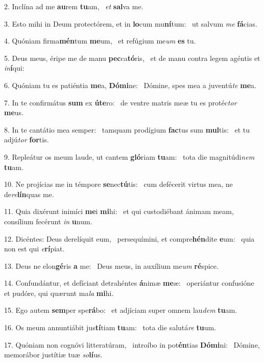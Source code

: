 2. Inclína ad me \textbf{au}rem \textbf{tu}am, \ast\  \textit{et} \textbf{sal}va me.\

3. Esto mihi in Deum protectórem, et in \textbf{lo}cum mu\textbf{ní}tum: \ast\  ut salvum \textit{me} \textbf{fá}cias.\

4. Quóniam firma\textbf{mén}tum \textbf{me}um, \ast\  et refúgium me\textit{um} \textbf{es} tu.\

5. Deus meus, éripe me de manu \textbf{pec}ca\textbf{tó}ris, \ast\  et de manu contra legem agéntis et \textit{in}\textbf{í}qui:\

6. Quóniam tu es patiéntia \textbf{me}a, \textbf{Dó}\textbf{mi}ne: \ast\  Dómine, spes mea a juventú\textit{te} \textbf{me}a.\

7. In te confirmátus \textbf{sum} ex \textbf{ú}\textbf{te}ro: \ast\  de ventre matris meæ tu es protéc\textit{tor} \textbf{me}us.\

8. In te cantátio mea semper: \dag\  tamquam prodígium \textbf{fac}tus sum \textbf{mul}tis: \ast\  et tu adjú\textit{tor} \textbf{for}tis.\

9. Repleátur os meum laude, ut cantem \textbf{gló}riam \textbf{tu}am: \ast\  tota die magnitúdi\textit{nem} \textbf{tu}am.\

10. Ne projícias me in témpore \textbf{se}nec\textbf{tú}tis: \ast\  cum defécerit virtus mea, ne de\textit{re}\textbf{lín}quas me.\

11. Quia dixérunt inimíci \textbf{me}i \textbf{mi}hi: \ast\  et qui custodiébant ánimam meam, consílium fecérunt \textit{in} \textbf{u}num.\

12. Dicéntes: Deus derelíquit eum, \dag\  persequímini, et compre\textbf{hén}dite \textbf{e}um: \ast\  quia non est qui \textit{e}\textbf{rí}piat.\

13. Deus ne elon\textbf{gé}ris \textbf{a} me: \ast\  Deus meus, in auxílium me\textit{um} \textbf{ré}spice.\

14. Confundántur, et defíciant detrahéntes \textbf{á}nimæ \textbf{me}æ: \ast\  operiántur confusióne et pudóre, qui quærunt ma\textit{la} \textbf{mi}hi.\

15. Ego autem \textbf{sem}per spe\textbf{rá}bo: \ast\  et adjíciam super omnem lau\textit{dem} \textbf{tu}am.\

16. Os meum annuntiábit jus\textbf{tí}tiam \textbf{tu}am: \ast\  tota die salutá\textit{re} \textbf{tu}um.\

17. Quóniam non cognóvi litteratúram, \dag\  introíbo in pot\textbf{én}tias \textbf{Dó}\textbf{mi}ni: \ast\  Dómine, memorábor justítiæ tuæ \textit{so}\textbf{lí}us.\

